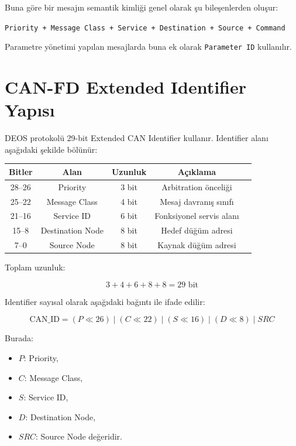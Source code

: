 \documentclass[a4paper,10pt]{article}
\newcommand{\code}[1]{\texttt{#1}}
\begin{document}
Buna göre bir mesajın semantik kimliği genel olarak şu bileşenlerden oluşur:

\begin{center}
\code{Priority + Message Class + Service + Destination + Source + Command}
\end{center}

Parametre yönetimi yapılan mesajlarda buna ek olarak \code{Parameter ID} kullanılır.

\section{CAN-FD Extended Identifier Yapısı}

DEOS protokolü 29-bit Extended CAN Identifier kullanır. Identifier alanı aşağıdaki
şekilde bölünür:

\begin{center}
\begin{tabular}{c c c c c}
\toprule
Bitler & Alan & Uzunluk & Açıklama \\
\midrule
28--26 & Priority & 3 bit & Arbitration önceliği \\
25--22 & Message Class & 4 bit & Mesaj davranış sınıfı \\
21--16 & Service ID & 6 bit & Fonksiyonel servis alanı \\
15--8  & Destination Node & 8 bit & Hedef düğüm adresi \\
7--0   & Source Node & 8 bit & Kaynak düğüm adresi \\
\bottomrule
\end{tabular}
\end{center}

Toplam uzunluk:

\[
3 + 4 + 6 + 8 + 8 = 29 \text{ bit}
\]

Identifier sayısal olarak aşağıdaki bağıntı ile ifade edilir:

\[
\text{CAN\_ID} =
(P \ll 26)
\;|\;
(C \ll 22)
\;|\;
(S \ll 16)
\;|\;
(D \ll 8)
\;|\;
SRC
\]

Burada:
\begin{itemize}
    \item \(P\): Priority,
    \item \(C\): Message Class,
    \item \(S\): Service ID,
    \item \(D\): Destination Node,
    \item \(SRC\): Source Node değeridir.
\end{itemize}
\end{document}
